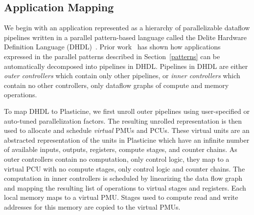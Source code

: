 %
%
%
%
%
%
\subsection{Application Mapping}
\label{mapping}
We begin with an application represented as a hierarchy of parallelizable dataflow pipelines written in a parallel pattern-based language called
the Delite Hardware Definition Language (DHDL)~\cite{dhdl}.
Prior work~\cite{delite2maxj} has shown how applications expressed in the parallel patterns described in Section~\ref{patterns}
can be automatically decomposed into pipelines in DHDL.
Pipelines in DHDL are either \emph{outer controllers} which contain only other pipelines, or \emph{inner controllers} which contain no other controllers, only dataflow graphs of compute and memory operations.

To map DHDL to Plasticine, we first unroll outer pipelines using user-specified or auto-tuned parallelization factors.
The resulting unrolled representation is then used to allocate and schedule \emph{virtual} PMUs and PCUs.
These virtual units are an abstracted representation of the units in Plasticine which have an infinite number of available
inputs, outputs, registers, compute stages, and counter chains.
As outer controllers contain no computation, only control logic, they map to a virtual PCU with no compute stages, only control logic and counter chains.
The computation in inner controllers is scheduled by linearizing the data flow graph and mapping the resulting list of operations
to virtual stages and registers.
Each local memory maps to a virtual PMU. Stages used to compute read and write addresses for this memory are copied to the virtual PMUs.

